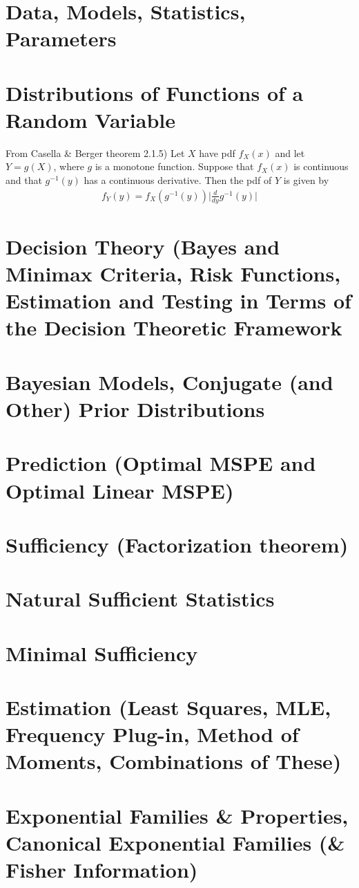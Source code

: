 \section{Data, Models, Statistics, Parameters}
\section{Distributions of Functions of a Random Variable}
\begin{thm}
	From Casella \& Berger theorem 2.1.5) Let $X$ have pdf $f_X(x)$ and let $Y=g(X)$, where $g$ is a monotone function. Suppose that $f_X(x)$ is continuous and that $g^{-1}(y)$ has a continuous derivative. Then the pdf of $Y$ is given by
	\begin{align}
		f_Y(y) = f_X(g^{-1}(y)) \Big|\frac{d}{dy} g^{-1}(y)\Big|
	\end{align}
\end{thm}

\section{Decision Theory (Bayes and Minimax Criteria, Risk Functions, Estimation and Testing in Terms of the Decision Theoretic Framework}
\section{Bayesian Models, Conjugate (and Other) Prior Distributions}
\section{Prediction (Optimal MSPE and Optimal Linear MSPE)}
\section{Sufficiency (Factorization theorem)}
\section{Natural Sufficient Statistics}
\section{Minimal Sufficiency}
\section{Estimation (Least Squares, MLE, Frequency Plug-in, Method of Moments, Combinations of These)}
\section{Exponential Families \& Properties, Canonical Exponential Families (\& Fisher Information)}
